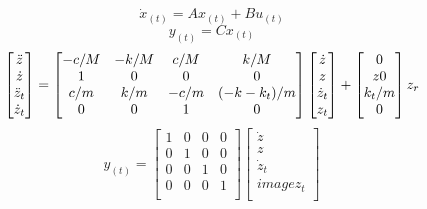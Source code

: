 $$\dot{x}_{(t)}=Ax_{(t)}+Bu_{(t)}$$
$$y_{(t)}=Cx_{(t)}$$
\begin{equation}
	\centering
	\begin{bmatrix}
		\ddot{z}   \\
		\dot{z}    \\
		\ddot{z}_t \\
		\dot{z}_t  \\
	\end{bmatrix}
	=
	\begin{bmatrix}
		-c/M & -k/M & c/M  & k/M        \\
		1    & 0    & 0    & 0          \\
		c/m  & k/m  & -c/m & (-k-k_t)/m \\
		0    & 0    & 1    & 0          \\
	\end{bmatrix}
	\begin{bmatrix}
		\dot{z}   \\
		z         \\
		\dot{z}_t \\
		z_t       \\
	\end{bmatrix}
	+
	\begin{bmatrix}
		0     \\
		z  0  \\
		k_t/m \\
		0     \\
	\end{bmatrix}
	z_r
	\label{eqn:ssm}
\end{equation}
$$
y_{(t)}=
\begin{bmatrix}
	1 & 0 & 0 & 0 \\
	0 & 1 & 0 & 0 \\
	0 & 0 & 1 & 0 \\
	0 & 0 & 0 & 1 \\
	
\end{bmatrix}
\begin{bmatrix}
	\dot{z}   \\
	z         \\
	\dot{z}_t \\image
	z_t       \\
\end{bmatrix}
$$

